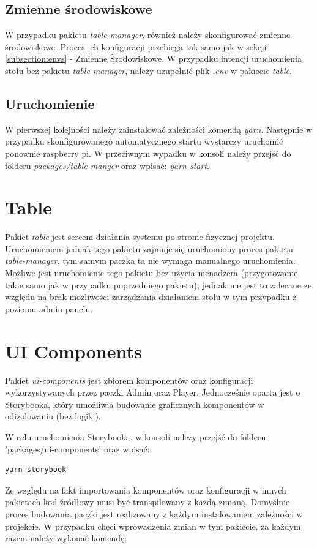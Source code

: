 \subsection{Zmienne środowiskowe}
W przypadku pakietu \textit{table-manager}, również należy skonfigurować zmienne środowiskowe. Proces ich konfiguracji przebiega tak samo jak w sekcji \ref{subsection:envs} - Zmienne Środowiskowe. W przypadku intencji uruchomienia stołu bez pakietu \textit{table-manager}, należy uzupełnić plik \textit{.env} w pakiecie \textit{table}.

\subsection{Uruchomienie}
W pierwszej kolejności należy zainstalować zależności komendą \textit{yarn}. Następnie w przypadku skonfigurowanego automatycznego startu wystarczy uruchomić ponownie raspberry pi. W przeciwnym wypadku w konsoli należy przejść do folderu \textit{packages/table-manger} oraz wpisać: \textit{yarn start}.

\section{Table}
Pakiet \textit{table} jest sercem działania systemu po stronie fizycznej projektu. Uruchomieniem jednak tego pakietu zajmuje się uruchomiony proces pakietu \textit{table-manager}, tym samym paczka ta nie wymaga manualnego uruchomienia. Możliwe jest uruchomienie tego pakietu bez użycia menadżera (przygotowanie takie samo jak w przypadku poprzedniego pakietu), jednak nie jest to zalecane ze względu na brak możliwości zarządzania działaniem stołu w tym przypadku z poziomu admin panelu.

\section{UI Components}
Pakiet \textit{ui-components} jest zbiorem komponentów oraz konfiguracji wykorzystywanych przez paczki Admin oraz Player. Jednocześnie oparta jest o Storybooka, który umożliwia budowanie graficznych komponentów w odizolowaniu (bez logiki).

W celu uruchomienia Storybooka, w konsoli należy przejść do folderu 'packages/ui-components' oraz wpisać:

\begin{lstlisting}
yarn storybook
\end{lstlisting}

Ze względu na fakt importowania komponentów oraz konfiguracji w innych pakietach kod źródłowy musi być transpilowany z każdą zmianą. Domyślnie proces budowania paczki jest realizowany z każdym instalowaniem zależności w projekcie. W przypadku chęci wprowadzenia zmian w tym pakiecie, za każdym razem należy wykonać komendę:

